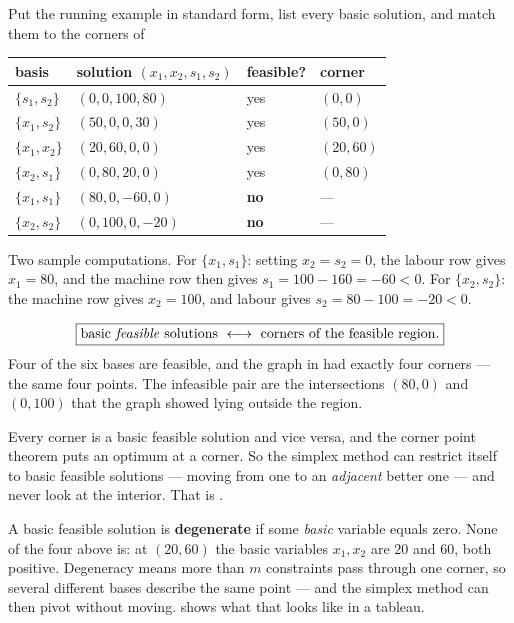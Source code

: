 \begin{worked}{Put the running example in standard form, list every basic solution, and match them to the corners of }
\begin{center}\footnotesize
\begin{tabular}{llll}
  \hline
  basis & solution $(x_{1},x_{2},s_{1},s_{2})$ & feasible? & corner\\
  \hline
  $\{s_{1},s_{2}\}$ & $(0,0,100,80)$ & yes & $(0,0)$\\
  $\{x_{1},s_{2}\}$ & $(50,0,0,30)$ & yes & $(50,0)$\\
  $\{x_{1},x_{2}\}$ & $(20,60,0,0)$ & yes & $(20,60)$\\
  $\{x_{2},s_{1}\}$ & $(0,80,20,0)$ & yes & $(0,80)$\\
  $\{x_{1},s_{1}\}$ & $(80,0,-60,0)$ & \textbf{no} & ---\\
  $\{x_{2},s_{2}\}$ & $(0,100,0,-20)$ & \textbf{no} & ---\\
  \hline
\end{tabular}
\end{center}
Two sample computations. For $\{x_{1},s_{1}\}$: setting $x_{2}=s_{2}=0$, the
labour row gives $x_{1}=80$, and the machine row then gives
$s_{1}=100-160=-60<0$. For $\{x_{2},s_{2}\}$: the machine row gives
$x_{2}=100$, and labour gives $s_{2}=80-100=-20<0$.

\[
  \boxed{\text{basic \emph{feasible} solutions}\ \longleftrightarrow\ \text{corners of the feasible region.}}
\]
Four of the six bases are feasible, and the graph in  had exactly
four corners --- the same four points. The infeasible pair are the
intersections $(80,0)$ and $(0,100)$ that the graph showed lying outside the
region.

Every corner is a basic feasible solution and vice versa, and the corner
point theorem puts an optimum at a corner. So the simplex method can restrict
itself to basic feasible solutions --- moving from one to an
\emph{adjacent} better one --- and never look at the interior. That is
.

A basic feasible solution is \textbf{degenerate} if some \emph{basic}
variable equals zero. None of the four above is: at $(20,60)$ the basic
variables $x_{1},x_{2}$ are $20$ and $60$, both positive. Degeneracy means
more than $m$ constraints pass through one corner, so several different
bases describe the same point --- and the simplex method can then pivot
without moving.  shows what that looks like in a tableau.
\end{worked}

